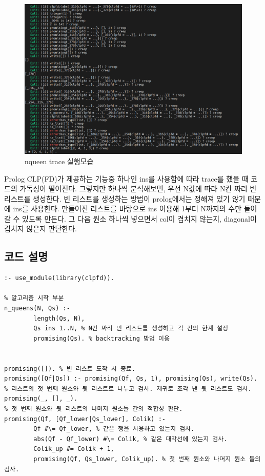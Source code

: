 \documentclass{article}
\begin{document}
\begin{figure}[h]
    \centering
    \includegraphics[scale = 0.7]{tracenqueens3.png}
    \caption{nqueen trace 실행모습}
\end{figure}

\newpage 

Prolog CLP(FD)가 제공하는 기능중 하나인 ins를 사용함에 따라 trace를 했을 때 코드의 가독성이 떨어진다. 그렇지만 하나씩 분석해보면, 우선 N값에 따라 N칸 짜리 빈 리스트를 생성한다. 빈 리스트를 생성하는 방법이 prolog에서는 정해져 있기 않기 때문에 ins를 사용한다. 만들어진 리스트를 바탕으로 ins 이용해 1부터 N까지의 수만 들어갈 수 있도록 만든다. 그 다음 원소 하나씩 넣으면서 col이 겹치지 않는지, diagonal이 겹치지 않은지 판단한다.

\newpage

\subsection{코드 설명}
\begin{verbatim}
:- use_module(library(clpfd)).

% 알고리즘 시작 부분
n_queens(N, Qs) :-
        length(Qs, N),
        Qs ins 1..N, % N칸 짜리 빈 리스트를 생성하고 각 칸의 한계 설정
        promising(Qs). % backtracking 방법 이용


promising([]). % 빈 리스트 도착 시 종료.
promising([Qf|Qs]) :- promising(Qf, Qs, 1), promising(Qs), write(Qs). % 리스트의 첫 번째 원소와 뒷 리스트로 나누고 검사. 재귀로 조각 낸 뒷 리스트도 검사.
promising(_, [], _).
% 첫 번째 원소와 뒷 리스트의 나머지 원소들 간의 적합성 판단.
promising(Qf, [Qf_lower|Qs_lower], Colik) :-
        Qf #\= Qf_lower, % 같은 행을 사용하고 있는지 검사.
        abs(Qf - Qf_lower) #\= Colik, % 같은 대각선에 있는지 검사.
        Colik_up #= Colik + 1,
        promising(Qf, Qs_lower, Colik_up). % 첫 번째 원소와 나머지 원소 들의 검사.

\end{verbatim}
\end{document}
